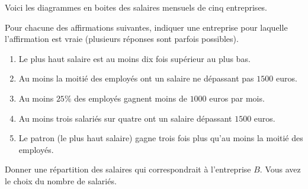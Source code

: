 
\begin{exercice}\label{exosmath-0249}

    Voici les diagrammes en boites des salaires mensuels de cinq entreprises. 

    \begin{center}

    \end{center}

Pour chacune des affirmations suivantes, indiquer une entreprise pour laquelle l'affirmation est vraie (plusieurs réponses sont parfois possibles).
\begin{enumerate}
    \item
        Le plus haut salaire est au moins dix fois supérieur au plus bas.
    \item
        Au moins la moitié des employés ont un salaire ne dépassant pas \( 1500\) euros.
    \item
        Au moins \( 25\%\) des employés gagnent moins de \( 1000\) euros par mois.
    \item
        Au moins trois salariés sur quatre ont un salaire dépassant \( 1500\) euros.
    \item
        Le patron (le plus haut salaire) gagne trois fois plus qu'au moins la moitié des employés.
\end{enumerate}

Donner une répartition des salaires qui correspondrait à l'entreprise \( B\). Vous avez le choix du nombre de salariés.

\end{exercice}
